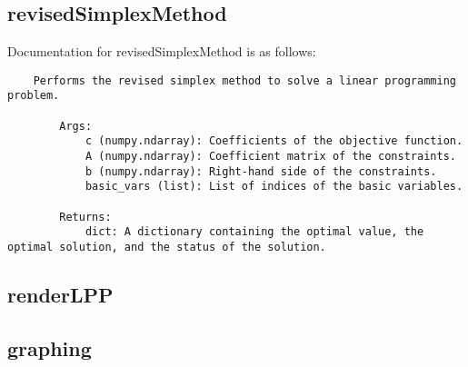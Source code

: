 \documentclass{article}
\numberwithin{equation}{section}
\begin{document}
\subsection{revisedSimplexMethod}
Documentation for revisedSimplexMethod is as follows:
\begin{lstlisting}
    Performs the revised simplex method to solve a linear programming problem.

        Args:
            c (numpy.ndarray): Coefficients of the objective function.
            A (numpy.ndarray): Coefficient matrix of the constraints.
            b (numpy.ndarray): Right-hand side of the constraints.
            basic_vars (list): List of indices of the basic variables.

        Returns:
            dict: A dictionary containing the optimal value, the optimal solution, and the status of the solution.
\end{lstlisting}
\subsection{renderLPP}

\subsection{graphing}

\newpage
\end{document}
